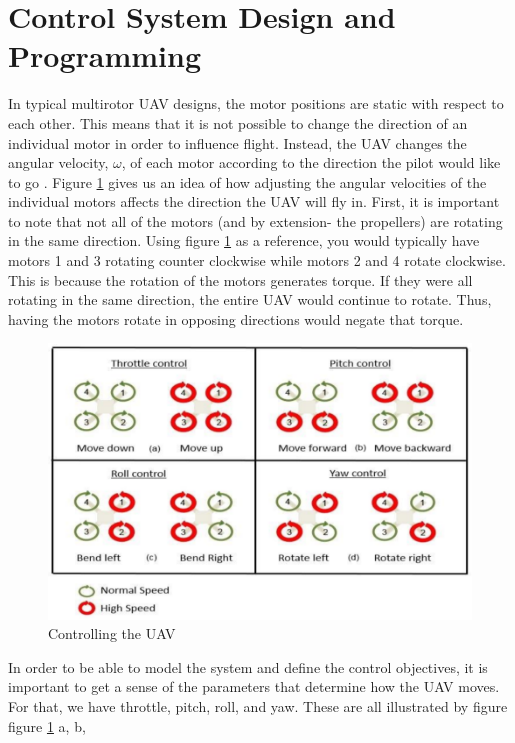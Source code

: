 \documentclass[english]{upeeei}
\begin{document}
\section{Control System Design and Programming}
In typical multirotor UAV designs, the motor positions are static with respect to each other. This means that it is not possible to change
the direction of an individual motor in order to influence flight. Instead, the UAV changes the angular velocity, $\omega$, of each motor according to
the direction the pilot would like to go \cite{fcDesign2019}. Figure \ref{fig:motor_signals} gives us an idea of how adjusting the angular
velocities of the individual motors affects the direction the UAV will fly in. First, it is important to note that not all of the motors
(and by extension- the propellers) are rotating in the same direction. Using figure \ref{fig:motor_signals} as a reference, you would
typically have motors 1 and 3 rotating counter clockwise while motors 2 and 4 rotate clockwise. This is because the rotation of the motors
generates torque. If they were all rotating in the same direction, the entire UAV would continue to rotate. Thus, having the motors rotate
in opposing directions would negate that torque. 
\begin{figure}[h]
    \centering
    \includegraphics[scale=0.5]{images/motor_signals.PNG}
    \caption{Controlling the UAV \cite{fcDesign2019}}
    \label{fig:motor_signals}
\end{figure}
\newline
In order to be able to model the system and define the control objectives, it is important to get a sense of the parameters that determine
how the UAV moves. For that, we have throttle, pitch, roll, and yaw. These are all illustrated by figure figure \ref{fig:motor_signals} a, b,
\end{document}
